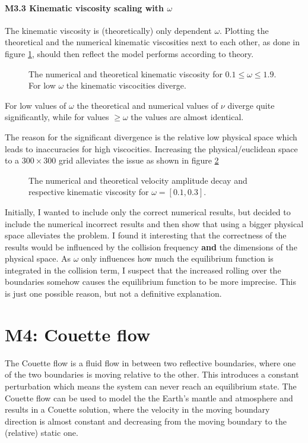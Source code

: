 \documentclass[a4paper,12pt, oneside]{book}
\begin{document}
\paragraph{M3.3 Kinematic viscosity scaling with $\omega$}
The kinematic viscosity is (theoretically) only dependent $\omega$. 
Plotting the theoretical and the numerical kinematic viscosities next to each other, as done in figure \ref{fig:m3-3-kinematic-viscocity}, should then reflect the model performs according to theory. 
\begin{figure}[ht]
\centering
\resizebox{0.8\columnwidth}{!}{\large}
\caption[Kinematic viscosity]{The numerical and theoretical kinematic viscosity for $0.1 \leq \omega \leq 1.9 $. For low $\omega$ the kinematic viscocities diverge.}
\label{fig:m3-3-kinematic-viscocity}
\end{figure}
For low values of $\omega$ the theoretical and numerical values of $\nu$ diverge quite significantly, while for values $\geq\omega$ the values are almost identical.

The reason for the significant divergence is the relative low physical space which leads to inaccuracies for high viscocities. Increasing the physical/euclidean space to a $300\times300$ grid alleviates the issue as shown in figure \ref{fig:m3-3-update}
\begin{figure}[ht]
\centering
\resizebox{0.8\columnwidth}{!}{\large}
\caption[Kinematic viscosity]{The numerical and theoretical velocity amplitude decay and respective kinematic viscosity for $\omega=[0.1, 0.3] $.}
\label{fig:m3-3-update}
\end{figure}
Initially, I wanted to include only the correct numerical results, but decided to include the numerical incorrect results and then show that using a bigger physical space alleviates the problem.
I found it interesting that the correctness of the results would be influenced by the collision frequency \textbf{and} the dimensions of the physical space. 
As $\omega$ only influences how much the equilibrium function is integrated in the collision term, I suspect that the increased rolling over the boundaries somehow causes the equilibrium function to be more imprecise. 
This is just one possible reason, but not a definitive explanation.

\section{M4: Couette flow}
The Couette flow is a fluid flow in between two reflective boundaries, where one of the two boundaries is moving relative to the other. 
This introduces a constant perturbation which means the system can never reach an equilibrium state.
The Couette flow can be used to model the the Earth's mantle and atmosphere and results in a Couette solution, where the velocity in the moving boundary direction is almost constant and decreasing from the moving boundary to the (relative) static one.
\end{document}
